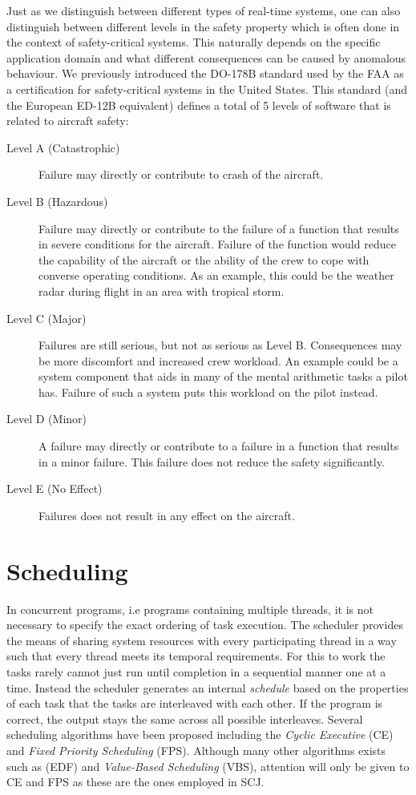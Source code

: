 Just as we distinguish between different types of real-time systems, one can also distinguish between different levels in the safety property which is often done in the context of safety-critical systems. This naturally depends on the specific application domain and what different consequences can be caused by anomalous behaviour. We previously introduced the DO-178B standard used by the FAA as a certification for safety-critical systems in the United States. This standard (and the European ED-12B equivalent) defines a total of 5 levels of software that is related to aircraft safety:
\begin{description}
	\item[Level A (Catastrophic)] Failure may directly or contribute to crash of the aircraft.  
	\item[Level B (Hazardous)] Failure may directly or contribute to the failure of a function that results in severe conditions for the aircraft. Failure of the function would reduce the capability of the aircraft or the ability of the crew to cope with converse operating conditions. As an example, this could be the weather radar during flight in an area with tropical storm.
	\item[Level C (Major)] Failures are still serious, but not as serious as Level B. Consequences may be more discomfort and increased crew workload. An example could be a system component that aids in many of the mental arithmetic tasks a pilot has. Failure of such a system puts this workload on the pilot instead.
	\item[Level D (Minor)] A failure may directly or contribute to a failure in a function that results in a minor failure. This failure does not reduce the safety significantly.
	\item[Level E (No Effect)] Failures does not result in any effect on the aircraft.
\end{description}




\section{Scheduling} %
\label{sec:scheduling}
In concurrent programs, i.e programs containing multiple threads, it is not necessary to specify the exact ordering of task execution. The scheduler provides the means of sharing system resources with every participating thread in a way such that every thread meets its temporal requirements. For this to work the tasks rarely cannot just run until completion in a sequential manner one at a time. Instead the scheduler generates an internal \textit{schedule} based on the properties of each task that the tasks are interleaved with each other. If the program is correct, the output stays the same across all possible interleaves. Several scheduling algorithms have been proposed including the \textit{Cyclic Executive} (CE) and \textit{Fixed Priority Scheduling} (FPS). Although many other algorithms exists such as  (EDF) and \textit{Value-Based Scheduling} (VBS), attention will only be given to CE and FPS as these are the ones employed in SCJ.

